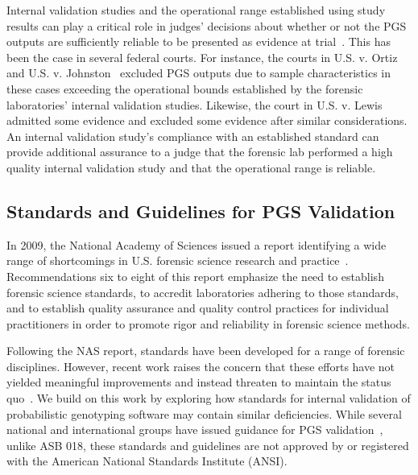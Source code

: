 Internal validation studies and the operational range established using study results can play a critical role in judges' decisions about whether or not the PGS outputs are sufficiently reliable to be presented as evidence at trial~\cite{roth2016machine}. This has been the case in several federal courts. For instance, the courts in U.S. v. Ortiz~\cite{ortiz} and U.S. v. Johnston~\cite{johnston} excluded PGS outputs due to sample characteristics in these cases exceeding the operational bounds established by the forensic laboratories' internal validation studies. Likewise, the court in U.S. v. Lewis~\cite{2020lewis} admitted some evidence and excluded some evidence after similar considerations. An internal validation study's compliance with an established standard can provide additional assurance to a judge that the forensic lab performed a high quality internal validation study and that the operational range is reliable.


\subsection{Standards and Guidelines for PGS Validation}
\label{sec:background-pgs-guidance}
In 2009, the National Academy of Sciences issued a report identifying a wide range of shortcomings in U.S. forensic science research and practice~\cite{national2009strengthening}. Recommendations six to eight of this report emphasize the need to establish forensic science standards, to accredit laboratories adhering to those standards, and to establish quality assurance and quality control practices for individual practitioners in order to promote rigor and reliability in forensic science methods. 

Following the NAS report, standards have been developed for a range of forensic disciplines. However, recent work raises the concern that these efforts have not yielded meaningful improvements and instead threaten to maintain the status quo~\cite{sinha2022radically, morrison2020vacuous}. We build on this work by exploring how standards for internal validation of probabilistic genotyping software may contain similar deficiencies. While several national and international groups have issued guidance for PGS validation~\cite{swgdam2015guidelines, coble2016dna, ukfsr2024guidelines, enfsi2023guidelines, fbi2025qas}, unlike ASB 018, these standards and guidelines are not approved by or registered with the American National Standards Institute (ANSI).

